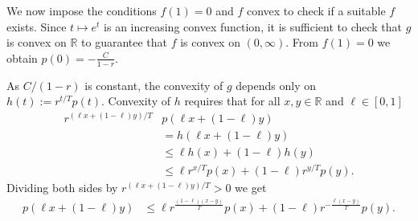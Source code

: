 \documentclass{article}
\newcommand{\R}{\mathbb R}
\begin{document}
We now impose the conditions $f(1)=0$ and $f$ convex to check if a suitable $f$ exists.
Since \(t \mapsto e^t\) is an increasing convex function, it is sufficient to check that $g$ is convex on $\R$ to guarantee that $f$ is convex on $(0,\infty)$.
From $f(1)=0$ we obtain $p(0) = -\frac{C}{1-r}$.

As $C/(1-r)$ is constant, the convexity of $g$ depends only on $h(t):=r^{t/T}p(t)$.
Convexity of \(h\) requires that for all $x,y\in\R$ and $\ell\in[0,1]$
\begin{align*}
   r^{(\ell x+(1-\ell)y)/T}&p(\ell x+(1-\ell)y)\\
   &=h(\ell x+(1-\ell)y)
   \\
&\le
\ell h(x)+(1-\ell)h(y)\\
&\le
\ell r^{x/T}p(x)
+
(1-\ell)r^{y/T}p(y).
\end{align*}
Dividing both sides by $r^{(\ell x+(1-\ell)y)/T}>0$ we get
\begin{align*}
p(\ell x+(1-\ell)y)
&\le
\ell r^{\frac{(1-\ell)(x-y)}{T}}p(x)
+
(1-\ell)r^{-\frac{\ell(x-y)}{T}}p(y).
\end{align*}
\end{document}
